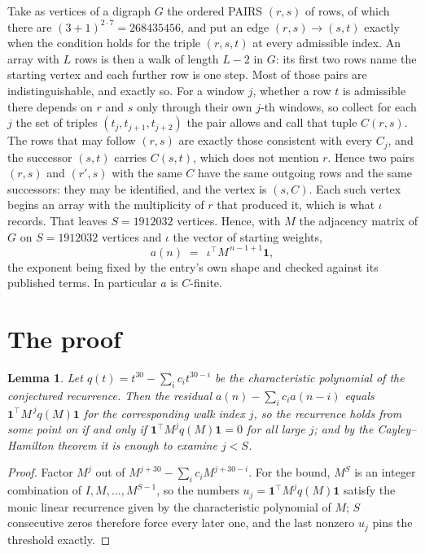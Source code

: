 \documentclass[11pt,a4paper]{article}
\theoremstyle{plain}
\newtheorem{lemma}[theorem]{Lemma}
\theoremstyle{definition}
\begin{document}
Take as vertices of a digraph $G$ the ordered PAIRS $(r,s)$ of rows, of which there are
$(3+1)^{2\cdot7}=268435456$, and put an edge $(r,s)\to(s,t)$ exactly when the condition
holds for the triple $(r,s,t)$ at every admissible index. An array with $L$ rows is then a
walk of length $L-2$ in $G$: its first two rows name the starting vertex and each further
row is one step. Most of those pairs are indistinguishable, and exactly so. For a window $j$, whether a row $t$ is admissible there depends on $r$ and $s$ only through their own $j$-th windows, so collect for each $j$ the set of triples $(t_j,t_{j+1},t_{j+2})$ the pair allows and call that tuple $C(r,s)$. The rows that may follow $(r,s)$ are exactly those consistent with every $C_j$, and the successor $(s,t)$ carries $C(s,t)$, which does not mention $r$. Hence two pairs $(r,s)$ and $(r',s)$ with the same $C$ have the same outgoing rows and the same successors: they may be identified, and the vertex is $(s,C)$. Each such vertex begins an array with the multiplicity of $r$ that produced it, which is what $\iota$ records. That leaves $S=1912032$ vertices. Hence, with $M$ the adjacency matrix of $G$ on $S=1912032$ vertices and
$\iota$ the vector of starting weights,
\[
a(n)\;=\;\,\iota^{\!\top}M^{\,n-1+1}\mathbf{1},
\]
the exponent being fixed by the entry's own shape and checked against its published terms.
In particular $a$ is $C$-finite.

\section{The proof}

\begin{lemma}\label{lem:crit}
Let $q(t)=t^{30}-\sum_i c_it^{30-i}$ be the characteristic polynomial of the
conjectured recurrence. Then the residual $a(n)-\sum_ic_ia(n-i)$ equals
$\mathbf{1}^{\!\top}M^{\,j}q(M)\mathbf{1}$ for the corresponding walk index
$j$, so the recurrence holds from some point on if and only if
$\mathbf{1}^{\!\top}M^{j}q(M)\mathbf{1}=0$ for all large $j$; and by the
Cayley--Hamilton theorem it is enough to examine $j<S$.
\end{lemma}

\begin{proof}
Factor $M^{j}$ out of $M^{j+30}-\sum_ic_iM^{j+30-i}$. For the bound, $M^{S}$
is an integer combination of $I,M,\dots,M^{S-1}$, so the numbers
$u_j=\mathbf{1}^{\!\top}M^{j}q(M)\mathbf{1}$ satisfy the monic linear recurrence given by
the characteristic polynomial of $M$; $S$ consecutive zeros therefore force every later one,
and the last nonzero $u_j$ pins the threshold exactly.
\end{proof}
\end{document}
